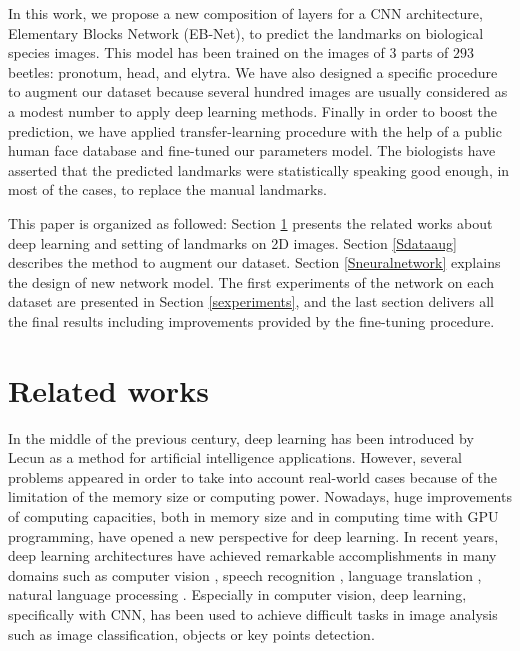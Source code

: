 \documentclass[review]{elsarticle}
\begin{document}
In this work, we propose  a new composition of layers for a CNN
architecture, Elementary Blocks Network (EB-Net), to predict the
landmarks on biological species images. This model has been 
trained on the images of $3$ parts of $293$ beetles: pronotum, head, and elytra. We have also designed a
specific procedure to augment our dataset because several hundred
images are usually considered as a modest number to apply deep
learning methods. Finally in order to boost the prediction, we have
applied transfer-learning procedure with the help of a public human
face database and fine-tuned our parameters model. The biologists have
asserted that the predicted landmarks were
statistically speaking good enough, in most of the cases, to replace the manual
landmarks. 

This paper is organized as followed: Section \ref{related_works}
presents the related works about deep learning and setting of
landmarks on 2D images. Section \ref{Sdataaug} describes the method to
augment our dataset. Section \ref{Sneuralnetwork} explains the design
of new network model. The first experiments of the network on each
dataset are presented in Section \ref{sexperiments}, and the last
section delivers all the final results including improvements provided
by the fine-tuning procedure.


\section{Related works}
\label{related_works}

In the middle of the previous century, deep learning
has been introduced  by Lecun \cite{lecun2015deep} as a method for artificial
intelligence applications. However, several problems  appeared in
order to take into account real-world cases because of the limitation
of the memory size or computing power. Nowadays, huge improvements of
computing capacities, both in memory size and in computing time with
GPU programming, have opened a new perspective for deep learning. In
recent years, deep learning architectures have achieved remarkable
accomplishments in many domains such as computer vision
\cite{lecun1998gradient, krizhevsky2012imagenet,
  szegedy2015going,farabet2013learning,li2015convolutional, vu2018heritage}, speech
recognition \cite{hinton2012deep, mikolov2011strategies}, language
translation \cite{jean2014using, sutskever2014sequence}, natural
language processing \cite{lecun2015deep, collobert2011natural,
  collobert2008unified}. Especially in computer vision, deep learning,
specifically with CNN, has been used to achieve difficult tasks in
image analysis such as image classification, objects or key points
detection.
\end{document}

